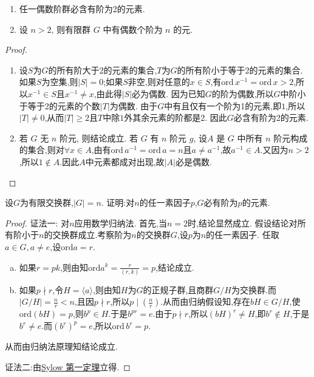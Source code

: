 \documentclass[../../main.tex]{subfiles}%
\begin{document}
\begin{example}
\begin{enumerate}[(1)]
\item 任一偶数阶群必含有阶为2的元素.

\item 设 $n > 2$, 则有限群 $G$ 中有偶数个阶为 $n$ 的元.
\end{enumerate}

\end{example}
\begin{proof}
\begin{enumerate}[(1)]
\item 设$S$为$G$的所有阶大于2的元素的集合,$T$为$G$的所有阶小于等于2的元素的集合. 如果$S$为空集,则$|S| = 0$;如果$S$非空,则对任意的$x \in S$,有$\text{ord}\,x^{-1} = \text{ord}\,x > 2$,所以$x^{-1} \in S$且$x^{-1} \neq x$,由此得$|S|$必为偶数. 因为已知$G$的阶为偶数,所以$G$中阶小于等于2的元素的个数$|T|$为偶数. 由于$G$中有且仅有一个阶为1的元素,即$1$,所以$|T| \neq 0$,从而$|T| \geqslant 2$且$T$中除$1$外其余元素的阶都是2. 因此$G$必含有阶为2的元素.

\item 若 $G$ 无 $n$ 阶元, 则结论成立. 若 $G$ 有 $n$ 阶元 $g$, 设$A$ 是 $G$ 中所有 $n$ 阶元构成的集合,则对$\forall x\in A$,由有$\text{ord}\,a^{-1} = \text{ord}\,a = n$且$a\neq a^{-1}$,故$a^{-1}\in A$.又因为$n>2$,所以$1\notin A$.因此$A$中元素都成对出现,故$|A|$必是偶数.

\end{enumerate}

\end{proof}

\begin{example}
设$G$为有限交换群,$|G|=n$. 证明:对$n$的任一素因子$p$,$G$必有阶为$p$的元素.
\end{example}
\begin{proof}

{\color{blue}证法一:}
对$n$应用数学归纳法.
首先,当$n=2$时,结论显然成立.
假设结论对所有阶小于$n$的交换群成立.考察阶为$n$的交换群$G$,设$p$为$n$的任一素因子.
任取$a\in G,a\neq e$,设$\text{ord}a=r$.
\begin{enumerate}[(a)]
\item 如果$r=pk$,则由知$\text{ord}a^k=\frac{r}{(r,k)}=p$,结论成立.
\item 如果$p\nmid r$,令$H=\langle a\rangle$,则由知$H$为$G$的正规子群,且商群$G/H$为交换群.而$|G/H|=\frac{n}{r}<n$,且因$p\nmid r$,所以$p\mid\left(\frac{n}{r}\right)$.从而由归纳假设知,存在$bH\in G/H$,使$\text{ord}(bH)=p$,则$b^p\in H$.于是$b^{pr}=e$.由于$p\nmid r$,所以$(bH)^r\neq H$,即$b^r\notin H$,于是$b^r\neq e$.而$(b^r)^p=e$,所以$\text{ord}\,b^r=p$.
\end{enumerate}
从而由归纳法原理知结论成立.

{\color{blue}证法二:}由\hyperref[theorem:Sylow 第一定理]{Sylow 第一定理}立得.

\end{proof}
\end{document}
